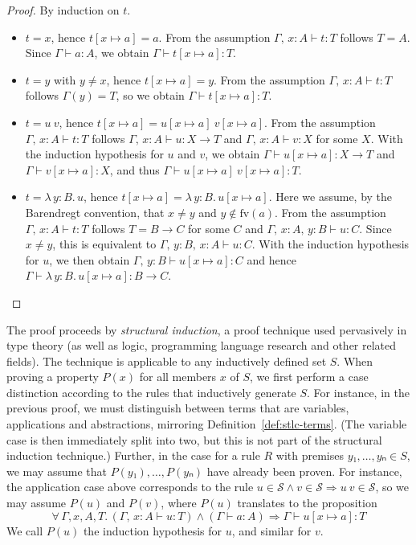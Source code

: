 \documentclass{scrartcl}
\theoremstyle{definition}
\newcommand{\Terms}{\mathcal{S}}
\newcommand{\fv}{\mathrm{fv}}
\newcommand{\Lam}[2]{λ\,#1.\, #2}
\begin{document}
\begin{proof}
  By induction on $t$.
  \begin{itemize}
    \item $t = x$, hence $t[x ↦ a] = a$.
          From the assumption $Γ,\, x : A ⊢ t : T$ follows $T = A$.
          Since $Γ ⊢ a : A$, we obtain $Γ ⊢ t[x ↦ a] : T$.
    \item $t = y$ with $y ≠ x$, hence $t[x ↦ a] = y$.
          From the assumption $Γ,\, x : A ⊢ t : T$ follows $Γ(y) = T$, so we obtain $Γ ⊢ t[x ↦ a] : T$.
    \item $t = u~v$, hence $t[x ↦ a] = u[x ↦ a]~v[x ↦ a]$.
          From the assumption $Γ,\, x : A ⊢ t : T$ follows $Γ,\, x : A ⊢ u : X → T$ and $Γ,\, x : A ⊢ v : X$ for some $X$.
          With the induction hypothesis for $u$ and $v$, we obtain $Γ ⊢ u[x ↦ a] : X → T$ and $Γ ⊢ v[x ↦ a] : X$, and thus $Γ ⊢ u[x ↦ a]~v[x ↦ a] : T$.
    \item $t = \Lam{y : B}{u}$, hence $t[x ↦ a] = \Lam{y : B}{u[x ↦ a]}$.
          Here we assume, by the Barendregt convention, that $x ≠ y$ and $y ∉ \fv(a)$.
          From the assumption $Γ,\, x : A ⊢ t : T$ follows $T = B → C$ for some $C$ and $Γ,\, x : A,\, y : B ⊢ u : C$.
          Since $x ≠ y$, this is equivalent to $Γ,\, y : B,\, x : A ⊢ u : C$.
          With the induction hypothesis for $u$, we then obtain $Γ,\, y : B ⊢ u[x ↦ a] : C$ and hence $Γ ⊢ \Lam{y : B}{u[x ↦ a]} : B → C$.
  \end{itemize}
\end{proof}

The proof proceeds by \emph{structural induction}, a proof technique used pervasively in type theory (as well as logic, programming language research and other related fields).
The technique is applicable to any inductively defined set $S$.
When proving a property $P(x)$ for all members $x$ of $S$, we first perform a case distinction according to the rules that inductively generate $S$.
For instance, in the previous proof, we must distinguish between terms that are variables, applications and abstractions, mirroring Definition~\ref{def:stlc-terms}.
(The variable case is then immediately split into two, but this is not part of the structural induction technique.)
Further, in the case for a rule $R$ with premises $y₁, \dots, yₙ ∈ S$, we may assume that $P(y₁), \dots, P(yₙ)$ have already been proven.
For instance, the application case above corresponds to the rule $u ∈ \Terms ∧ v ∈ \Terms ⇒ u~v ∈ \Terms$, so we may assume $P(u)$ and $P(v)$, where $P(u)$ translates to the proposition
\[
  ∀\, Γ, x, A, T.\, (Γ,\, x : A ⊢ u : T) ∧ (Γ ⊢ a : A) ⇒ Γ ⊢ u[x ↦ a] : T
\]
We call $P(u)$ the induction hypothesis for $u$, and similar for $v$.
\end{document}
